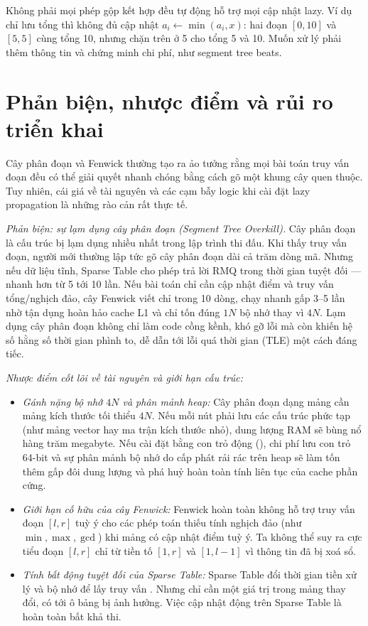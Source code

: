 \documentclass[../../algorithm.tex]{subfiles}
\begin{document}
\begin{cambay}
Không phải mọi phép gộp kết hợp đều tự động hỗ trợ mọi cập nhật lazy.
Ví dụ chỉ lưu tổng thì không đủ cập nhật \(a_i\leftarrow\min(a_i,x)\):
hai đoạn \([0,10]\) và \([5,5]\) cùng tổng 10, nhưng chặn trên ở 5 cho tổng 5 và 10.
Muốn xử lý phải thêm thông tin và chứng minh chi phí, như segment tree beats.
\end{cambay}

\section{Phản biện, nhược điểm và rủi ro triển khai}

Cây phân đoạn và Fenwick thường tạo ra ảo tưởng rằng mọi bài toán truy vấn đoạn đều có thể giải quyết nhanh chóng bằng cách gõ một khung cây quen thuộc. Tuy nhiên, cái giá về tài nguyên và các cạm bẫy logic khi cài đặt lazy propagation là những rào cản rất thực tế.

\emph{Phản biện: sự lạm dụng cây phân đoạn (Segment Tree Overkill).} Cây phân đoạn là cấu trúc bị lạm dụng nhiều nhất trong lập trình thi đấu. Khi thấy truy vấn đoạn, người mới thường lập tức gõ cây phân đoạn dài cả trăm dòng mã. Nhưng nếu dữ liệu tĩnh, Sparse Table cho phép trả lời RMQ trong thời gian  tuyệt đối --- nhanh hơn  từ 5 tới 10 lần. Nếu bài toán chỉ cần cập nhật điểm và truy vấn tổng/nghịch đảo, cây Fenwick viết chỉ trong 10 dòng, chạy nhanh gấp 3--5 lần nhờ tận dụng hoàn hảo cache L1 và chỉ tốn đúng \(1N\) bộ nhớ thay vì \(4N\). Lạm dụng cây phân đoạn không chỉ làm code cồng kềnh, khó gỡ lỗi mà còn khiến hệ số hằng số thời gian phình to, dễ dẫn tới lỗi quá thời gian (TLE) một cách đáng tiếc.

\emph{Nhược điểm cốt lõi về tài nguyên và giới hạn cấu trúc:}
\begin{itemize}
\item \emph{Gánh nặng bộ nhớ \(4N\) và phân mảnh heap:} Cây phân đoạn dạng mảng cần mảng kích thước tối thiểu \(4N\). Nếu mỗi nút phải lưu các cấu trúc phức tạp (như mảng vector hay ma trận kích thước nhỏ), dung lượng RAM sẽ bùng nổ hàng trăm megabyte. Nếu cài đặt bằng con trỏ động (), chi phí lưu con trỏ 64-bit và sự phân mảnh bộ nhớ do cấp phát rải rác trên heap sẽ làm tốn thêm gấp đôi dung lượng và phá huỷ hoàn toàn tính liên tục của cache phần cứng.
\item \emph{Giới hạn cố hữu của cây Fenwick:} Fenwick hoàn toàn không hỗ trợ truy vấn đoạn \([l, r]\) tuỳ ý cho các phép toán thiếu tính nghịch đảo (như \(\min, \max, \gcd\)) khi mảng có cập nhật điểm tuỳ ý. Ta không thể suy ra cực tiểu đoạn \([l, r]\) chỉ từ tiền tố \([1, r]\) và \([1, l-1]\) vì thông tin đã bị xoá sổ.
\item \emph{Tính bất động tuyệt đối của Sparse Table:} Sparse Table đổi thời gian tiền xử lý  và bộ nhớ  để lấy truy vấn . Nhưng chỉ cần một giá trị trong mảng thay đổi, có tới  ô bảng bị ảnh hưởng. Việc cập nhật động trên Sparse Table là hoàn toàn bất khả thi.
\end{itemize}
\end{document}

